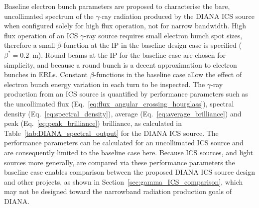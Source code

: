 \documentclass[../main.tex]{subfiles}
\begin{document}
Baseline electron bunch parameters are proposed to characterise the bare, uncollimated spectrum of the $\gamma$-ray radiation produced by the DIANA ICS source when configured solely for high flux operation, not for narrow bandwidth. High flux operation of an ICS $\gamma$-ray source requires small electron bunch spot sizes, therefore a small $\beta$-function at the IP in the baseline design case is specified ($\beta^{*}=0.2$~\si{\meter}). Round beams at the IP for the baseline case are chosen for simplicity, and because a round bunch is a decent approximation to electron bunches in ERLs. Constant $\beta$-functions in the baseline case allow the effect of electron bunch energy variation in each turn to be inspected. The $\gamma$-ray production from an ICS source is quantified by performance parameters such as the uncollimated flux (Eq.~\ref{eq:flux_angular_crossing_hourglass}), spectral density (Eq.~\ref{eq:spectral_density}), average (Eq.~\ref{eq:average_brilliance}) and peak (Eq.~\ref{eq:peak_brilliance}) brilliance, as calculated in Table~\ref{tab:DIANA_spectral_output} for the DIANA ICS source. The performance parameters can be calculated for an uncollimated ICS source and are consequently limited to the baseline case here. Because ICS sources, and light sources more generally, are compared via these performance parameters the baseline case enables comparison between the proposed DIANA ICS source design and other projects, as shown in Section~\ref{sec:gamma_ICS_comparison}, which may not be designed toward the narrowband radiation production goals of DIANA.
\end{document}
